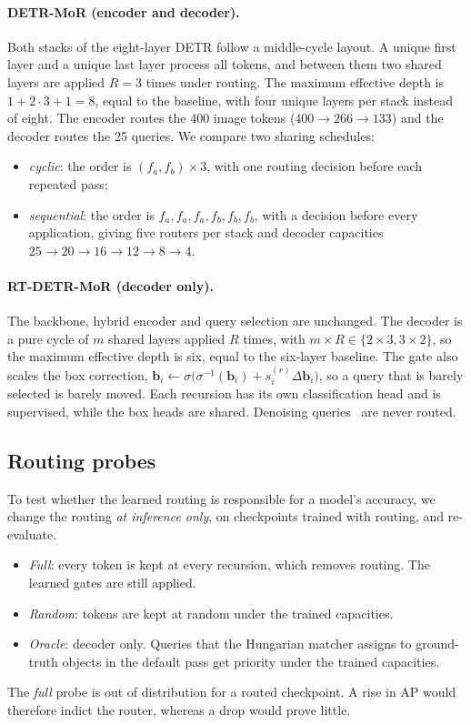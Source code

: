 \documentclass[pdflatex,iicol,sn-basic,Numbered]{sn-jnl}
\newcommand{\x}{\ensuremath{\times}}
\begin{document}
\paragraph{DETR-MoR (encoder and decoder).}
Both stacks of the eight-layer DETR follow a middle-cycle layout. A unique first layer and a unique last layer process all tokens, and between them two shared layers are applied $R=3$ times under routing. The maximum effective depth is $1+2\cdot3+1=8$, equal to the baseline, with four unique layers per stack instead of eight. The encoder routes the 400 image tokens ($400\!\to\!266\!\to\!133$) and the decoder routes the 25 queries. We compare two sharing schedules:
\begin{itemize}
\item \emph{cyclic}: the order is $(f_a,f_b)\times3$, with one routing decision before each repeated pass;
\item \emph{sequential}: the order is $f_a,f_a,f_a,f_b,f_b,f_b$, with a decision before every application, giving five routers per stack and decoder capacities $25\!\to\!20\!\to\!16\!\to\!12\!\to\!8\!\to\!4$.
\end{itemize}

\paragraph{RT-DETR-MoR (decoder only).}
The backbone, hybrid encoder and query selection are unchanged. The decoder is a pure cycle of $m$ shared layers applied $R$ times, with $m\times R\in\{2\x3,3\x2\}$, so the maximum effective depth is six, equal to the six-layer baseline. The gate also scales the box correction, $\mathbf{b}_i\leftarrow\sigma\big(\sigma^{-1}(\mathbf{b}_i)+s^{(r)}_i\Delta\mathbf{b}_i\big)$, so a query that is barely selected is barely moved. Each recursion has its own classification head and is supervised, while the box heads are shared. Denoising queries~\cite{li2022dn} are never routed.

\subsection{Routing probes}\label{sec:probes}
To test whether the learned routing is responsible for a model's accuracy, we change the routing \emph{at inference only}, on checkpoints trained with routing, and re-evaluate.
\begin{itemize}
\item \emph{Full}: every token is kept at every recursion, which removes routing. The learned gates are still applied.
\item \emph{Random}: tokens are kept at random under the trained capacities.
\item \emph{Oracle}: decoder only. Queries that the Hungarian matcher assigns to ground-truth objects in the default pass get priority under the trained capacities.
\end{itemize}
The \emph{full} probe is out of distribution for a routed checkpoint. A rise in AP would therefore indict the router, whereas a drop would prove little.
\end{document}
